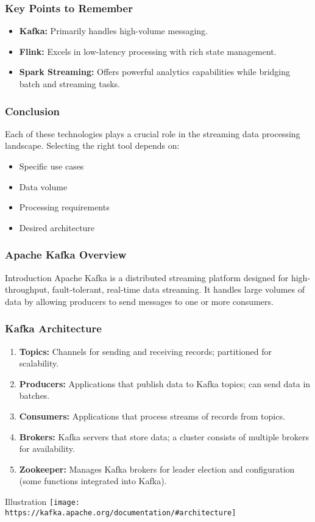 \documentclass[aspectratio=169]{beamer}
\begin{document}
\begin{frame}[fragile]
    \frametitle{Key Points to Remember}
    \begin{itemize}
        \item \textbf{Kafka:} Primarily handles high-volume messaging.
        \item \textbf{Flink:} Excels in low-latency processing with rich state management.
        \item \textbf{Spark Streaming:} Offers powerful analytics capabilities while bridging batch and streaming tasks.
    \end{itemize}
\end{frame}

\begin{frame}[fragile]
    \frametitle{Conclusion}
    Each of these technologies plays a crucial role in the streaming data processing landscape. Selecting the right tool depends on:
    \begin{itemize}
        \item Specific use cases
        \item Data volume
        \item Processing requirements
        \item Desired architecture
    \end{itemize}
\end{frame}

\begin{frame}[fragile]
    \frametitle{Apache Kafka Overview}
    \begin{block}{Introduction}
        Apache Kafka is a distributed streaming platform designed for high-throughput, fault-tolerant, real-time data streaming. 
        It handles large volumes of data by allowing producers to send messages to one or more consumers.
    \end{block}
\end{frame}

\begin{frame}[fragile]
    \frametitle{Kafka Architecture}
    \begin{enumerate}
        \item \textbf{Topics:} Channels for sending and receiving records; partitioned for scalability.
        \item \textbf{Producers:} Applications that publish data to Kafka topics; can send data in batches.
        \item \textbf{Consumers:} Applications that process streams of records from topics.
        \item \textbf{Brokers:} Kafka servers that store data; a cluster consists of multiple brokers for availability.
        \item \textbf{Zookeeper:} Manages Kafka brokers for leader election and configuration (some functions integrated into Kafka).
    \end{enumerate}
    \begin{block}{Illustration}
        \texttt{[image: https://kafka.apache.org/documentation/\#architecture]}
    \end{block}
\end{frame}
\end{document}
